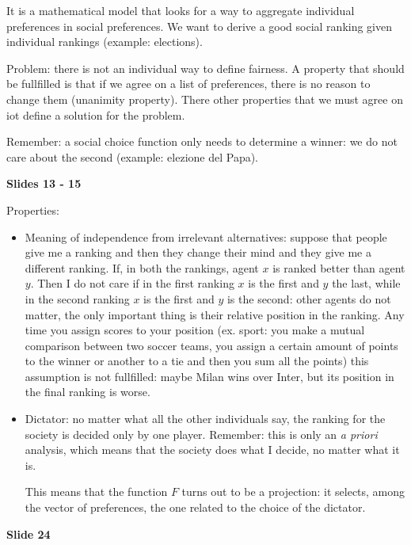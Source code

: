 \documentclass[pt11,a4paper,twoside,reqno,openright]{paper}
\begin{document}

\bigskip
\noindent It is a mathematical model that looks for a way to aggregate 
individual preferences in social preferences. We want to derive a good social 
ranking given individual rankings (example: elections).

\noindent Problem: there is not an individual way to define fairness. A property 
that should be fullfilled is that if we agree on a list of preferences, there 
is no reason to change them (unanimity property). There other properties that 
we must agree on iot define a solution for the problem.

\noindent Remember: a social choice function only needs to determine a winner: 
we do not care about the second (example: elezione del Papa).

\bigskip
\noindent \textbf{Slides 13 - 15}

\noindent Properties:

\begin{itemize}
\item Meaning of independence from irrelevant alternatives: suppose that 
people give me a ranking and then they change their mind and they give me a 
different ranking. If, in both the rankings, agent $x$ is ranked better than 
agent $y$. Then I do not care if in the first ranking $x$ is the first and $y$ 
the last, while in the second ranking $x$ is the first and $y$ is the second: 
other agents do not matter, the only important thing is their relative position 
in the ranking. Any time you assign scores to your position (ex. sport: you make 
a mutual comparison between two soccer teams, you assign a certain amount 
of points to the winner or another to a tie and then you sum all the points) 
this assumption is not fullfilled: maybe Milan wins over Inter, but its position 
in the final ranking is worse.

\item Dictator: no matter what all the other individuals say, the ranking 
for the society is decided only by one player. Remember: this is only an 
\textit{a priori} analysis, which means that the society does what I decide, no 
matter what it is.

\noindent This means that the function $F$ turns out to be a projection: it 
selects, among the vector of preferences, the one related to the choice of the 
dictator.
\end{itemize}

\bigskip
\noindent \textbf{Slide 24}
\end{document}
